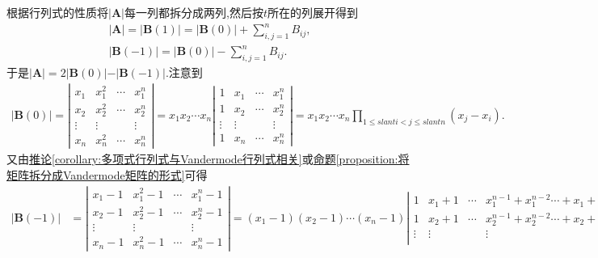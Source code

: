 \documentclass[../../main.tex]{subfiles}
\begin{document}
\begin{solution}
根据行列式的性质将\(\vert\boldsymbol{A}\vert\)每一列都拆分成两列,然后按\(t\)所在的列展开得到
\begin{gather*}
\vert\boldsymbol{A}\vert=\vert\boldsymbol{B}(1)\vert=\vert\boldsymbol{B}(0)\vert+\sum_{i,j = 1}^{n}B_{ij},
\\
\vert\boldsymbol{B}(-1)\vert=\vert\boldsymbol{B}(0)\vert-\sum_{i,j = 1}^{n}B_{ij}.
\end{gather*}
于是\(\vert\boldsymbol{A}\vert = 2\vert\boldsymbol{B}(0)\vert - \vert\boldsymbol{B}(-1)\vert\).注意到
\begin{align*}
\vert\boldsymbol{B}(0)\vert=\left|\begin{matrix}
x_1 & x_{1}^{2} & \cdots & x_{1}^{n}\\
x_2 & x_{2}^{2} & \cdots & x_{2}^{n}\\
\vdots & \vdots &  & \vdots\\
x_n & x_{n}^{2} & \cdots & x_{n}^{n}
\end{matrix}\right|=x_1x_2\cdots x_n\left|\begin{matrix}
1 & x_1 & \cdots & x_{1}^{n}\\
1 & x_2 & \cdots & x_{2}^{n}\\
\vdots & \vdots &  & \vdots\\
1 & x_n & \cdots & x_{n}^{n}
\end{matrix}\right|=x_1x_2\cdots x_n\prod_{1\leqslant slant i < j\leqslant slant n}(x_j - x_i). 
\end{align*}
又由\hyperref[corollary:多项式行列式与Vandermode行列式相关]{推论\ref{corollary:多项式行列式与Vandermode行列式相关}}或\hyperref[proposition:将矩阵拆分成Vandermode矩阵的形式]{命题\ref{proposition:将矩阵拆分成Vandermode矩阵的形式}}可得
\begin{align*}
\vert\boldsymbol{B}(-1)\vert&=\left|\begin{matrix}
x_1 - 1 & x_{1}^{2} - 1 & \cdots & x_{1}^{n} - 1\\
x_2 - 1 & x_{2}^{2} - 1 & \cdots & x_{2}^{n} - 1\\
\vdots & \vdots &  & \vdots\\
x_n - 1 & x_{n}^{2} - 1 & \cdots & x_{n}^{n} - 1
\end{matrix}\right|
=(x_1 - 1)(x_2 - 1)\cdots (x_n - 1)\left|\begin{matrix}
1 & x_1 + 1 & \cdots & x_{1}^{n - 1} + x_{1}^{n - 2}\cdots + x_1 + 1\\
1 & x_2 + 1 & \cdots & x_{2}^{n - 1} + x_{2}^{n - 2}\cdots + x_2 + 1\\
\vdots & \vdots &  & \vdots\\

\end{matrix}
\end{align*}
\end{solution}
\end{document}
